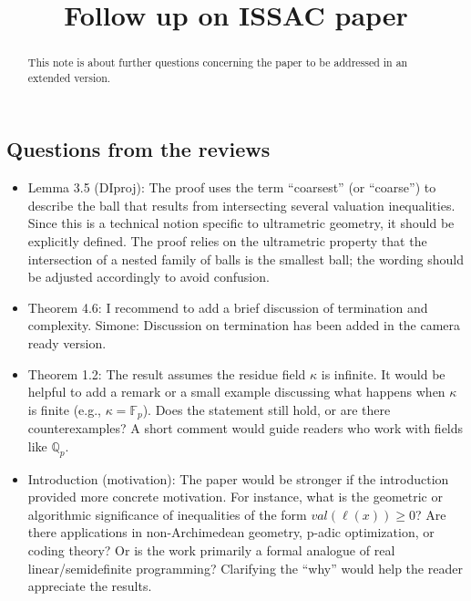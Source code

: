\documentclass{amsart}
\newcommand{\simone}[1]{{\color{blue} {\sc Simone}: #1}} %
\begin{document}
\title{Follow up on ISSAC paper}
\author{}

\maketitle

\begin{abstract}
  This note is about further questions concerning the paper \cite{cornou2026}
  to be addressed in an extended version.
\end{abstract}

\setcounter{section}{1}

%
%


\subsection{Questions from the reviews}

\begin{itemize}
\item
  Lemma 3.5 (DIproj): The proof uses the term ``coarsest'' (or ``coarse'') to describe the
ball that results from intersecting several valuation inequalities. Since this is a technical
notion specific to ultrametric geometry, it should be explicitly defined. The proof relies
on the ultrametric property that the intersection of a nested family of balls is the smallest
ball; the wording should be adjusted accordingly to avoid confusion.
\item
  Theorem 4.6: I recommend to add a brief discussion of termination and complexity.
  \simone{Discussion on termination has been added in the camera ready version}. 
\item
  Theorem 1.2: The result assumes the residue field $\kappa$ is infinite. It would be helpful to
  add a remark or a small example discussing what happens when $\kappa$ is finite
  (e.g., $\kappa = \mathbb{F}_p$). Does the statement still hold, or are there counterexamples?
  A short comment would guide readers who work with fields like $\mathbb{Q}_p$.
\item
  Introduction (motivation): The paper would be stronger if the introduction provided
more concrete motivation. For instance, what is the geometric or algorithmic significance
of inequalities of the form $val(\ell(x)) \geq 0$? Are there applications in non-Archimedean
geometry, p-adic optimization, or coding theory? Or is the work primarily a formal
analogue of real linear/semidefinite programming? Clarifying the ``why'' would help the
reader appreciate the results.
\end{itemize}
\end{document}
